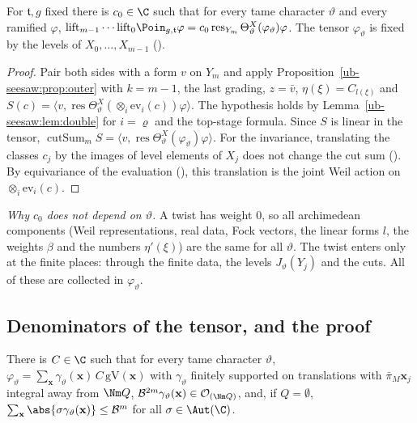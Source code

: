 \begin{proposition}\label{ub-seesaw:prop:chain}
For $\mathfrak t,g$ fixed there is $c_0\in\C$ such that for every tame character $\vartheta$ and every ramified
$\varphi$,
$\mathrm{lift}_{m-1}\cdots\mathrm{lift}_0\Poin_{g,\mathfrak t}\varphi=c_0\operatorname{res}_{Y_m}\Theta^X_\vartheta(\varphi_\vartheta)\varphi$.
The tensor $\varphi_\vartheta$ is fixed by the levels of $X_0,\dots,X_{m-1}$
().
\end{proposition}

\begin{proof}
Pair both sides with a form $v$ on $Y_m$ and apply Proposition~\ref{ub-seesaw:prop:outer} with $k=m-1$, the last grading,
$z=\bar v$, $\eta(\xi)=C_{l(\xi)}$ and
$S(c)=\langle v,\operatorname{res}\Theta^X_\vartheta(\otimes_i\mathrm{ev}_i(c))\varphi\rangle$. The
hypothesis holds by Lemma~\ref{ub-seesaw:lem:double} for $i=\varrho$ and the top-stage formula.
Since $S$ is linear in the tensor, $\operatorname{cutSum}_mS=\langle v,\operatorname{res}\Theta^X_\vartheta(\varphi_\vartheta)\varphi\rangle$.
For the invariance, translating the classes $c_j$ by the images of level elements of $X_j$ does not
change the cut sum (). By equivariance of the evaluation
(), this translation is the
joint Weil action on $\otimes_i\mathrm{ev}_i(c)$.
\end{proof}

\emph{Why $c_0$ does not depend on $\vartheta$.} A twist has weight $0$, so all archimedean
components (Weil representations, real data, Fock vectors, the linear forms $l$, the weights $\beta$
and the numbers $\eta'(\xi)$) are the same for all $\vartheta$. The twist enters only at the finite places:
through the finite data, the levels $J_\vartheta(Y_j)$ and the cuts. All of these are collected in
$\varphi_\vartheta$.

\subsection{Denominators of the tensor, and the proof}

\begin{lemma}\label{ub-seesaw:lem:seesawDatum}
There is $C\in\C$ such that for every tame character $\vartheta$,
$\varphi_\vartheta=\sum_{\mathbf x}\gamma_\vartheta(\mathbf x)\,C\,\mathrm{gV}(\mathbf x)$ with $\gamma_\vartheta$ finitely supported on
translations with $\bar\pi_M\mathbf x_j$ integral away from $\Nm Q$,
$\mathcal B^{2m}\gamma_\vartheta(\mathbf x)\in\mathcal O_{(\Nm Q)}$, and, if $Q=\emptyset$,
$\sum_{\mathbf x}\abs{\sigma \gamma_\vartheta(\mathbf x)}\le\mathcal B^{m}$ for all $\sigma\in\Aut(\C)$.
\end{lemma}


